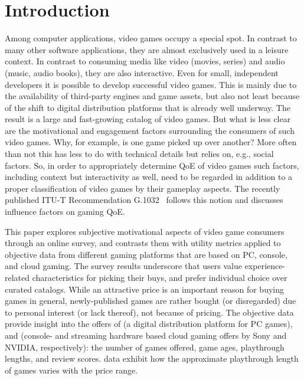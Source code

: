 
\section{Introduction}

Among computer applications, video games occupy a special spot.
In contrast to many other software applications, they are almost
exclusively used in a leisure context.
In contrast to consuming media like video (movies, series) and
audio (music, audio books), they are also interactive.
Even for small, independent developers it is possible to develop successful video games. This is mainly due to the availability of third-party engines and game assets, but also not least because of the shift to digital distribution platforms that is already well underway. The result is a large and fast-growing catalog of video games.
But what is less clear are the motivational and engagement factors surrounding the consumers of such video games. Why, for example, is one game picked up over another? More often than not this has less to do with technical details but relies on, e.g., social factors.
So, in order to appropriately determine \gls{QoE} of video games such factors, including context but interactivity as well, need to be regarded in addition to a proper classification of video games by their gameplay aspects.
The recently published \acrshort{ITU-T} Recommendation
G.1032~\cite{itutg1032} follows this notion and discusses influence
factors on gaming \gls{QoE}.

This paper explores subjective motivational aspects of video game
consumers through an online survey, and contrasts them with utility
metrics applied to objective data from different gaming platforms
that are based on PC, console, and cloud gaming.
The survey results underscore that users value experience-related
characteristics for picking their buys, and prefer individual choice
over curated catalogs. While an attractive price is an important
reason for buying games in general, newly-published games are rather
bought (or disregarded) due to personal interest (or lack thereof),
not because of pricing.
The objective data provide insight into the offers of \steam
(a digital distribution platform for PC games), \psnow and \gfnow
(console- and streaming hardware based cloud gaming offers by Sony
and NVIDIA, respectively): the number
of games offered, game ages, playthrough lengths, and review scores.
\steam data exhibit how the approximate playthrough length of games
varies with the price range.
